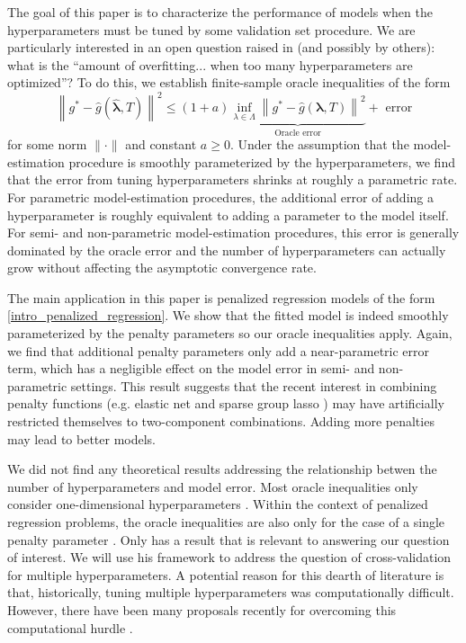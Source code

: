 \documentclass[12pt]{article}
\begin{document}
The goal of this paper is to characterize the performance of models when the hyperparameters must be tuned by some validation set procedure. We are particularly interested in an open question raised in \citet{bengio2000gradient} (and possibly by others): what is the ``amount of overfitting... when too many hyperparameters are optimized''? To do this, we establish finite-sample oracle inequalities of the form
\begin{equation}
\label{thrm:intro_oracle_ineq}
\left \| g^* - \hat{g}\left (\hat{\boldsymbol{\lambda}}, T \right ) \right \|^2
\le
(1+a)
\underbrace{\inf_{\lambda \in \Lambda} \left \| g^* - \hat{g}\left (\boldsymbol{\lambda} , T \right ) \right \|^2}_{\text{Oracle error}}
+ \text{ error}
\end{equation}
for some norm $\| \cdot \|$ and constant $a \ge 0$. Under the assumption that the model-estimation procedure is smoothly parameterized by the hyperparameters, we find that the error from tuning hyperparameters shrinks at roughly a parametric rate. For parametric model-estimation procedures, the additional error of adding a hyperparameter is roughly equivalent to adding a parameter to the model itself. For semi- and non-parametric model-estimation procedures, this error is generally dominated by the oracle error and the number of hyperparameters can actually grow without affecting the asymptotic convergence rate.

The main application in this paper is penalized regression models of the form \eqref{intro_penalized_regression}. We show that the fitted model is indeed smoothly parameterized by the penalty parameters so our oracle inequalities apply. Again, we find that additional penalty parameters only add a near-parametric error term, which has a negligible effect on the model error in semi- and non-parametric settings. This result suggests that the recent interest in combining penalty functions (e.g. elastic net and sparse group lasso \citep{zou2003regression, simon2013sparse}) may have artificially restricted themselves to two-component combinations. Adding more penalties may lead to better models.

We did not find any theoretical results addressing the relationship betwen the number of hyperparameters and model error. Most oracle inequalities only consider one-dimensional hyperparameters \citep{van2003unified, van2004asymptotic, gyorfi2006distribution}. Within the context of penalized regression problems, the oracle inequalities are also only for the case of a single penalty parameter \citep{golub1979generalized, chetverikov2016cross, chatterjee2015prediction}. Only \citet{lecue2012oracle} has a result that is relevant to answering our question of interest. We will use his framework to address the question of cross-validation for multiple hyperparameters. A potential reason for this dearth of literature is that, historically, tuning multiple hyperparameters was computationally difficult. However, there have been many proposals recently for overcoming this computational hurdle \citep{bengio2000gradient, foo2008efficient, snoek2012practical}.
\end{document}
